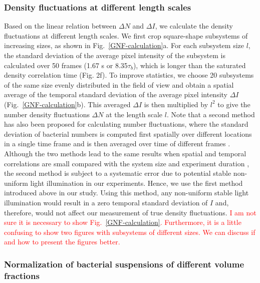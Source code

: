 \documentclass[twocolumn,aps,prx,amsmath,amssymb,longbibliography]{revtex4-2}
\begin{document}
\subsubsection{Density fluctuations at different length scales}

Based on the linear relation between $\Delta N$ and $\Delta I$, we calculate the density fluctuations at different length scales. We first crop square-shape subsystems of increasing sizes, as shown in Fig.~\ref{GNF-calculation}a. For each subsystem size $l$, the standard deviation of the average pixel intensity of the subsystem is calculated over 50 frames (1.67 s or 8.35$\tau_b$), which is longer than the saturated density correlation time (Fig. 2f). To improve statistics, we choose 20 subsystems of the same size evenly distributed in the field of view and obtain a spatial average of the temporal standard deviation of the average pixel intensity $\Delta I$ (Fig.~\ref{GNF-calculation}b). This averaged $\Delta I$ is then multiplied by $l^2$ to give the number density fluctuations $\Delta N$ at the length scale $l$. Note that a second method has also been proposed for calculating number fluctuations, where the standard deviation of bacterial numbers is computed first spatially over different locations in a single time frame and is then averaged over time of different frames \cite{}. Although the two methods lead to the same results when spatial and temporal correlations are small compared with the system size and experiment duration \cite{}, the second method is subject to a systematic error due to potential stable non-uniform light illumination in our experiments. Hence, we use the first method introduced above in our study. Using this method, any non-uniform stable light illumination would result in a zero temporal standard deviation of $I$ and, therefore, would not affect our measurement of true density fluctuations.
\textcolor{red}{I am not sure it is necessary to show Fig.~\ref{GNF-calculation}. Furthermore, it is a little confusing to show two figures with subsystems of different sizes. We can discuss if and how to present the figures better.}



\subsubsection{Normalization of bacterial suspensions of different volume fractions}
\end{document}
